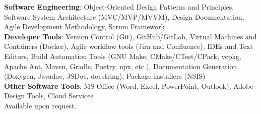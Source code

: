 \textbf{Software Engineering}: 
Object-Oriented Design Patterns and Principles, 
Software System Architecture (MVC/MVP/MVVM), Design Documentation, 
Agile Development Methodology, Scrum Framework\\
\textbf{Developer Tools}: Version Control (Git), GitHub/GitLab, 
Virtual Machines and Containers (Docker), 
Agile workflow tools (Jira and Confluence), 
IDEs and Text Editors, 
Build Automation Tools (GNU Make, CMake/CTest/CPack, vcpkg, 
Apache Ant, Maven, Gradle, Poetry, npx, etc.), 
Documentation Generation (Doxygen, Javadoc, JSDoc, docstring), 
Package Installers (NSIS)\\
\textbf{Other Software Tools}: MS Office (Word, Excel, PowerPoint, Outlook), 
Adobe Design Tools, Cloud Services\\

Available upon request.



